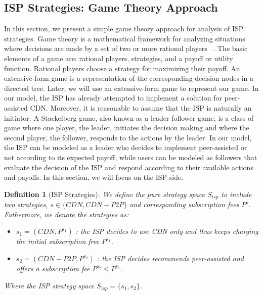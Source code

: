 \documentclass[paper]{ieice}
\begin{document}
\subsection{ISP Strategies: Game Theory Approach}

In this section, we present a simple game theory approach for analysis of ISP strategies.  
Game theory is a mathematical framework for analyzing situations where decisions are made by a set of two or more rational players~ \cite{gametheory}.  
The basic elements of a game are: rational players, strategies, and a payoff or utility function. 
Rational players choose a strategy for maximizing their payoff.  
An extensive-form game is a representation of the corresponding decision nodes in a directed tree.  
Later, we will use an extensive-form game to represent our game.  
In our model, the ISP has already attempted to implement a solution for peer-assisted CDN.  
Moreover, it is reasonable to assume that the ISP is naturally an initiator.  
A Stackelberg game, also known as a leader-follower game, is a class of game where one player, the leader, initiates the decision making and where the second player, the follower, responds to the actions by the leader.  
In our model, the ISP can be modeled as a leader who decides to implement peer-assisted or not according to its expected payoff, while users can be modeled as followers that evaluate the decision of the ISP and respond according to their available actions and payoffs.
In this section, we will focus on the ISP side.

\newtheorem{theorem}{Definition}
\begin{theorem}[ISP Strategies]
We define the pure strategy space $S_{isp}$ to include two strategies, $s \in \{CDN, CDN-P2P\}$ and corresponding subscription fees $P^{s}$.
Futhermore, we denote the strategies as:
\begin{itemize}
	\item $s_1 = (CDN, P^{s_1})$ : the ISP decides to use CDN only and thus keeps charging the initial subscription free $P^{s_1}$.
	\item $s_2 = (CDN-P2P, P^{s_2})$ : the ISP decides recommends peer-assisted and offers a subscription fee $P^{s_2} \le P^{s_1}$.
\end{itemize}
Where the ISP strategy space $S_{isp} = \{s_1,s_2\}$.
\end{theorem}
\end{document}
